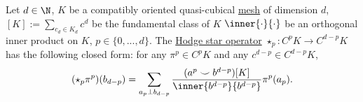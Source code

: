 \begin{proposition}
  Let
    $d \in \N$,
    $K$ be a compatibly oriented quasi-cubical
    \hyperref[cmc:mesh:definition]{mesh} of dimension $d$,
    $[K] := \sum_{c_d \in K_d} c^d$ be the fundamental class of $K$
    $\inner{\cdot}{\cdot}$ be an orthogonal inner product on $K$,
    $p \in \{0, ..., d\}$.
  The \hyperref[cmc/mesh/quasi_cubical/hodge_star/concept-definition]
               {Hodge star operator}
  $\star_p \colon C^p K \to C^{d - p} K$ has the following closed form:
  for any $\pi^p \in C^p K$ and any $c^{d - p} \in C^{d - p} K$,
  \begin{equation}
    (\star_p \pi^p)(b_{d - p})
    = \sum_{a_p \perp b_{d - p}}
      \frac{(a^p \smile b^{d - p})[K]}{\inner{b^{d - p}}{b^{d - p}}} \pi^p(a_p).
  \end{equation}
\end{proposition}
